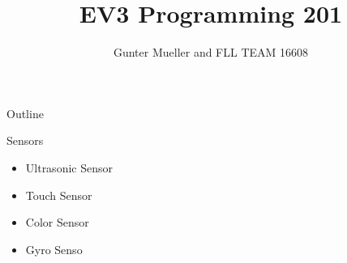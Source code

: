 \documentclass[11pt]{beamer}
\author{Gunter Mueller and FLL TEAM 16608}
\title{EV3 Programming 201}
\begin{document}
\begin{frame}
\titlepage
\end{frame}


\begin{frame}{Outline}
\tableofcontents
\end{frame}

\begin{frame}{Sensors}
\begin{itemize}
\item Ultrasonic Sensor
\item Touch Sensor
\item Color Sensor
\item Gyro Senso
\end{itemize}
\end{frame}
\end{document}
